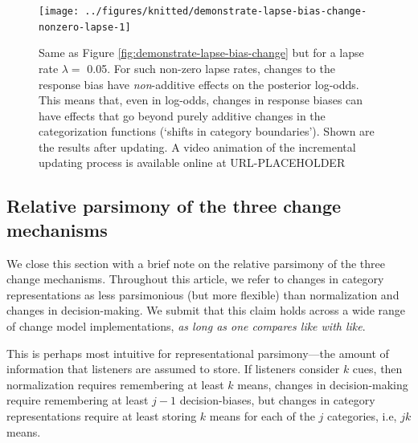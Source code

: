 \documentclass[
  11pt,
  man,floatsintext]{apa6}
\begin{document}
\begin{figure}

{\centering \texttt{[image: ../figures/knitted/demonstrate-lapse-bias-change-nonzero-lapse-1]} 

}

\caption{Same as Figure \ref{fig:demonstrate-lapse-bias-change} but for a lapse rate \(\lambda=\) 0.05. For such non-zero lapse rates, changes to the response bias have \emph{non}-additive effects on the posterior log-odds. This means that, even in log-odds, changes in response biases can have effects that go beyond purely additive changes in the categorization functions (`shifts in category boundaries'). Shown are the results after updating. A video animation of the incremental updating process is available online at URL-PLACEHOLDER}\label{fig:demonstrate-lapse-bias-change-nonzero-lapse}
\end{figure}

\subsection{Relative parsimony of the three change mechanisms}\label{sec:parsimony}

We close this section with a brief note on the relative parsimony of the three change mechanisms. Throughout this article, we refer to changes in category representations as less parsimonious (but more flexible) than normalization and changes in decision-making. We submit that this claim holds across a wide range of change model implementations, \emph{as long as one compares like with like}.

This is perhaps most intuitive for representational parsimony---the amount of information that listeners are assumed to store. If listeners consider \(k\) cues, then normalization requires remembering at least \(k\) means, changes in decision-making require remembering at least \(j-1\) decision-biases, but changes in category representations require at least storing \(k\) means for each of the \(j\) categories, i.e, \(jk\) means.
\end{document}
